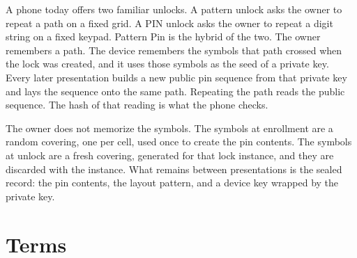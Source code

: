 \documentclass[11pt]{article}
\begin{document}
A phone today offers two familiar unlocks.
A pattern unlock asks the owner to repeat a path on a fixed grid.
A PIN unlock asks the owner to repeat a digit string on a fixed keypad.
Pattern Pin is the hybrid of the two.
The owner remembers a path.
The device remembers the symbols that path crossed when the lock was created, and it uses those symbols as the seed of a private key.
Every later presentation builds a new public pin sequence from that private key and lays the sequence onto the same path.
Repeating the path reads the public sequence.
The hash of that reading is what the phone checks.

The owner does not memorize the symbols.
The symbols at enrollment are a random covering, one per cell, used once to create the pin contents.
The symbols at unlock are a fresh covering, generated for that lock instance, and they are discarded with the instance.
What remains between presentations is the sealed record: the pin contents, the layout pattern, and a device key wrapped by the private key.

\section{Terms}
\end{document}
